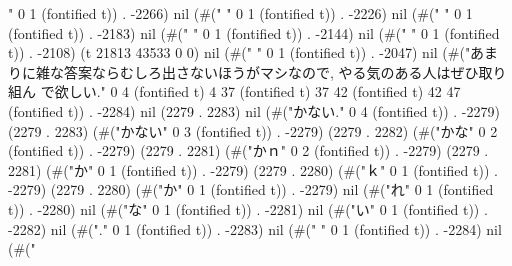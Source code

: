 " 0 1 (fontified t)) . -2266) nil (#("
" 0 1 (fontified t)) . -2226) nil (#("
" 0 1 (fontified t)) . -2183) nil (#("
" 0 1 (fontified t)) . -2144) nil (#("
" 0 1 (fontified t)) . -2108) (t 21813 43533 0 0) nil (#("
" 0 1 (fontified t)) . -2047) nil (#("あまりに雑な答案ならむしろ出さないほうがマシなので, やる気のある人はぜひ取り組ん
で欲しい." 0 4 (fontified t) 4 37 (fontified t) 37 42 (fontified t) 42 47 (fontified t)) . -2284) nil (2279 . 2283) nil (#("かない." 0 4 (fontified t)) . -2279) (2279 . 2283) (#("かない" 0 3 (fontified t)) . -2279) (2279 . 2282) (#("かな" 0 2 (fontified t)) . -2279) (2279 . 2281) (#("かｎ" 0 2 (fontified t)) . -2279) (2279 . 2281) (#("か" 0 1 (fontified t)) . -2279) (2279 . 2280) (#("ｋ" 0 1 (fontified t)) . -2279) (2279 . 2280) (#("か" 0 1 (fontified t)) . -2279) nil (#("れ" 0 1 (fontified t)) . -2280) nil (#("な" 0 1 (fontified t)) . -2281) nil (#("い" 0 1 (fontified t)) . -2282) nil (#("." 0 1 (fontified t)) . -2283) nil (#(" " 0 1 (fontified t)) . -2284) nil (#("
